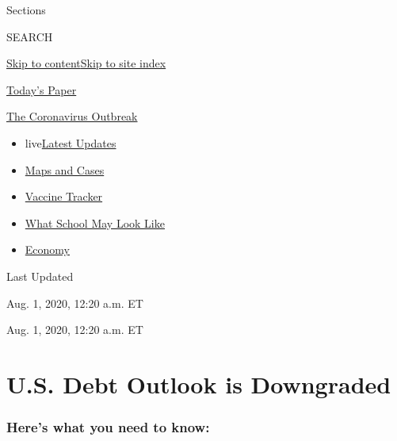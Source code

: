 Sections

SEARCH

\protect\hyperlink{site-content}{Skip to
content}\protect\hyperlink{site-index}{Skip to site index}

\href{https://myaccount.nytimes.com/auth/login?response_type=cookie\&client_id=vi}{}

\href{https://www.nytimes.com/section/todayspaper}{Today's Paper}

\href{https://www.nytimes.com/news-event/coronavirus}{The Coronavirus
Outbreak}

\begin{itemize}
\tightlist
\item
  live\href{https://www.nytimes.com/2020/08/01/world/coronavirus-covid-19.html}{Latest
  Updates}
\item
  \href{https://www.nytimes.com/interactive/2020/us/coronavirus-us-cases.html}{Maps
  and Cases}
\item
  \href{https://www.nytimes.com/interactive/2020/science/coronavirus-vaccine-tracker.html}{Vaccine
  Tracker}
\item
  \href{https://www.nytimes.com/interactive/2020/07/29/us/schools-reopening-coronavirus.html}{What
  School May Look Like}
\item
  \href{https://www.nytimes.com/live/2020/07/31/business/stock-market-today-coronavirus}{Economy}
\end{itemize}

Last Updated

Aug. 1, 2020, 12:20 a.m. ET

Aug. 1, 2020, 12:20 a.m. ET

\hypertarget{us-debt-outlook-is-downgraded}{%
\section{U.S. Debt Outlook is
Downgraded}\label{us-debt-outlook-is-downgraded}}

\hypertarget{heres-what-you-need-to-know}{%
\subsubsection{Here's what you need to
know:}\label{heres-what-you-need-to-know}}

